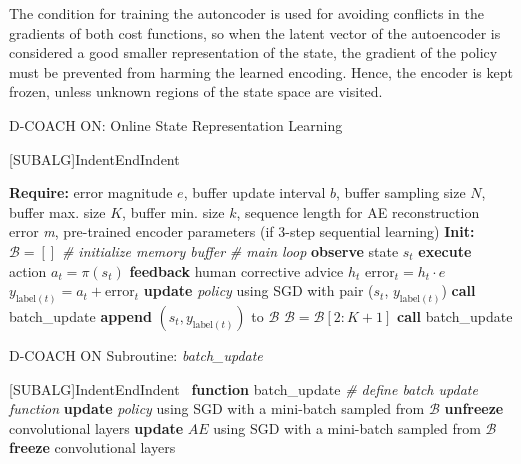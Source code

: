The condition for training the autoncoder is used for avoiding conflicts in the gradients of both cost functions, so when the latent vector of the autoencoder is considered a good smaller representation of the state, the gradient of the policy must be prevented from harming the learned encoding. Hence, the encoder is kept frozen, unless unknown regions of the state space are visited. 

\begin{algorithm}[h]
\caption{D-COACH ON: Online State Representation Learning}\label{algorithm:EnDeepCOACH}
\begin{algorithmic}[1]
[SUBALG]{Indent}{EndIndent}{}{\algorithmicend\ }%

\State \textbf{Require:} error magnitude $\textit{e}$, buffer update interval $b$, buffer sampling size $N$, buffer max. size $K$, buffer min. size $k$, sequence length for AE reconstruction error \emph{m}, pre-trained encoder parameters (if 3-step sequential learning) 
\State \textbf{Init:} $\mathcal{B} = []$ \emph{\# initialize memory buffer}
 \emph{\# main loop}
\State \textbf{observe} state $s_{t}$
\State \textbf{execute} action $a_{t}=\pi(s_{t})$
\State \textbf{feedback} human corrective advice $h_{t}$
\State $\mathrm{error}_{t} = h_{t}\cdot e$
\State $y_{\mathrm{label}(t)} = a_{t} + \mathrm{error}_{t}$ 
\State \textbf{update} \emph{policy} using SGD with pair ($s_{t}$, $y_{\mathrm{label}(t)}$) 
\State \textbf{call} batch\_update
\State \textbf{append} $(s_{t}, y_{\mathrm{label}(t)})$ to $\mathcal{B}$
\EndIf
{}
\State $\mathcal{B} = \mathcal{B}[2:K+1]$
\EndIf
{}
\State \textbf{call} batch\_update
\EndIf
\EndFor
\end{algorithmic}
\end{algorithm}

\begin{algorithm}[h]
\caption{D-COACH ON Subroutine: \emph{batch\_update}}\label{algorithm:batch_update}
\begin{algorithmic}[1]
[SUBALG]{Indent}{EndIndent}{}{\algorithmicend\ }%
\State \textbf{function} batch\_update \emph{\# define batch update function}
\Indent
{}
\State \textbf{update} \emph{policy} using SGD with a mini-batch sampled from $\mathcal{B}$
\State \textbf{unfreeze} convolutional layers
\State \textbf{update} $AE$ using SGD with a mini-batch sampled from $\mathcal{B}$
\Else
\State \textbf{freeze} convolutional layers
\EndIf
\EndIf
\EndIndent
\end{algorithmic}
\end{algorithm}

